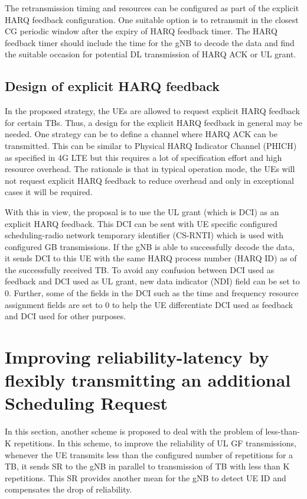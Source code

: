 \documentclass[conference]{IEEEtran}
\begin{document}
The retransmission timing and resources can be configured as part of the explicit HARQ feedback configuration. One suitable option is to retransmit in the closest CG periodic window after the expiry of HARQ feedback timer. The HARQ feedback timer should include the time for the gNB to decode the data and find the suitable occasion for potential DL transmission of HARQ ACK or UL grant.

\subsection{Design of explicit HARQ feedback}\label{IIBB}

In the proposed strategy, the UEs are allowed to request explicit HARQ feedback for certain TBs. Thus, a design for the explicit HARQ feedback in general may be needed. One strategy can be to define a channel where HARQ ACK can be transmitted. This can be similar to Physical HARQ Indicator Channel (PHICH) as specified in 4G LTE but this requires a lot of specification effort and high resource overhead. The rationale is that in typical operation mode, the UEs will not request explicit HARQ feedback to reduce overhead and only in exceptional cases it will be required. 

With this in view, the proposal is to use the UL grant (which is DCI) as an explicit HARQ feedback. This DCI can be sent with UE specific configured scheduling-radio network temporary identifier (CS-RNTI) which is used with configured GB transmissions. If the gNB is able to successfully decode the data, it sends DCI to this UE with the same HARQ process number (HARQ ID) as of the successfully received TB. To avoid any confusion between DCI used as feedback and DCI used as UL grant, new data indicator (NDI) field can be set to 0. Further, some of the fields in the DCI such as the time and frequency resource assignment fields are set to 0 to help the UE differentiate DCI used as feedback and DCI used for other purposes.

\section{Improving reliability-latency by flexibly transmitting an additional Scheduling Request}\label{III}

In this section, another scheme is proposed to deal with the problem of less-than-K repetitions. In this scheme, to improve the reliability of UL GF transmissions, whenever the UE transmits less than the configured number of repetitions for a TB, it sends SR to the gNB in parallel to transmission of TB with less than K repetitions. This SR provides another mean for the gNB to detect UE ID and compensates the drop of reliability.
\end{document}
